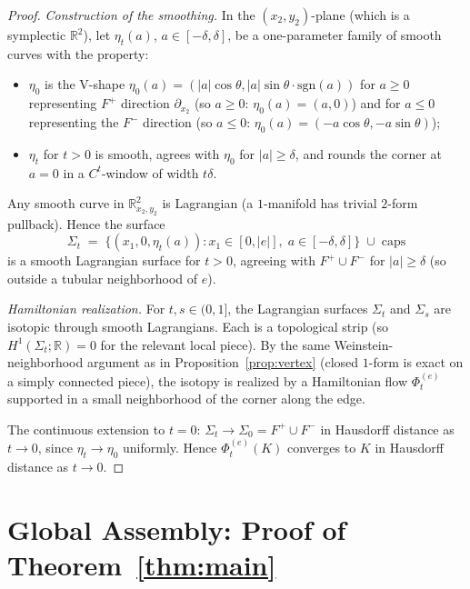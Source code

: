 \documentclass[12pt]{article}
\theoremstyle{definition}
\begin{document}
\begin{proof}
\smallskip\noindent\emph{Construction of the smoothing.} In the $(x_2,y_2)$-plane (which is a symplectic $\mathbb{R}^2$), let $\eta_t(a)$, $a\in[-\delta,\delta]$, be a one-parameter family of smooth curves with the property:
\begin{itemize}
\item $\eta_0$ is the V-shape $\eta_0(a)=(|a|\cos\theta,|a|\sin\theta\cdot\mathrm{sgn}(a))$ for $a\geq 0$ representing $F^+$ direction $\partial_{x_2}$ (so $a\geq 0$: $\eta_0(a)=(a,0)$) and for $a\leq 0$ representing the $F^-$ direction (so $a\leq 0$: $\eta_0(a)=(-a\cos\theta,-a\sin\theta)$);
\item $\eta_t$ for $t>0$ is smooth, agrees with $\eta_0$ for $|a|\geq\delta$, and rounds the corner at $a=0$ in a $C^t$-window of width $t\delta$.
\end{itemize}
Any smooth curve in $\mathbb{R}^2_{x_2,y_2}$ is Lagrangian (a $1$-manifold has trivial $2$-form pullback). Hence the surface
\begin{equation}\label{eq:edge-surface}
\Sigma_t \;=\; \{(x_1,0,\eta_t(a)):x_1\in[0,|e|],\;a\in[-\delta,\delta]\}\;\cup\;\text{caps}
\end{equation}
is a smooth Lagrangian surface for $t>0$, agreeing with $F^+\cup F^-$ for $|a|\geq\delta$ (so outside a tubular neighborhood of $e$).

\smallskip\noindent\emph{Hamiltonian realization.} For $t,s\in(0,1]$, the Lagrangian surfaces $\Sigma_t$ and $\Sigma_s$ are isotopic through smooth Lagrangians. Each is a topological strip (so $H^1(\Sigma_t;\mathbb{R})=0$ for the relevant local piece). By the same Weinstein-neighborhood argument as in Proposition~\ref{prop:vertex} (closed $1$-form is exact on a simply connected piece), the isotopy is realized by a Hamiltonian flow $\Phi_t^{(e)}$ supported in a small neighborhood of the corner along the edge.

The continuous extension to $t=0$: $\Sigma_t\to\Sigma_0=F^+\cup F^-$ in Hausdorff distance as $t\to 0$, since $\eta_t\to\eta_0$ uniformly. Hence $\Phi_t^{(e)}(K)$ converges to $K$ in Hausdorff distance as $t\to 0$.
\end{proof}

\section{Global Assembly: Proof of Theorem~\ref{thm:main}}
\end{document}
